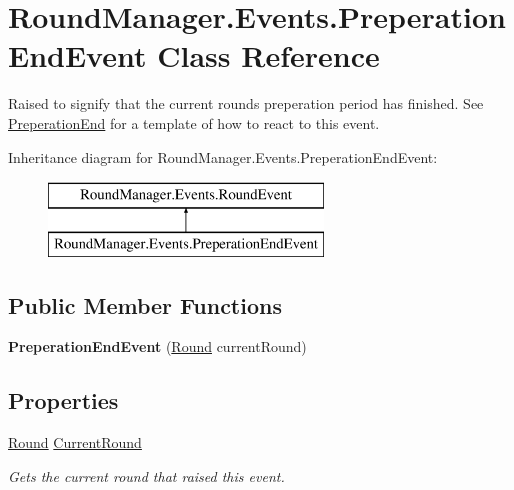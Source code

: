 \hypertarget{class_round_manager_1_1_events_1_1_preperation_end_event}{}\section{Round\+Manager.\+Events.\+Preperation\+End\+Event Class Reference}
\label{class_round_manager_1_1_events_1_1_preperation_end_event}


Raised to signify that the current rounds preperation period has finished. See \hyperlink{class_round_manager_1_1_preperation_end}{Preperation\+End} for a template of how to react to this event.  


Inheritance diagram for Round\+Manager.\+Events.\+Preperation\+End\+Event\+:\begin{figure}[H]
\begin{center}
\leavevmode
\includegraphics[height=2.000000cm]{class_round_manager_1_1_events_1_1_preperation_end_event}
\end{center}
\end{figure}
\subsection*{Public Member Functions}
\begin{DoxyCompactItemize}
\item 
\hypertarget{class_round_manager_1_1_events_1_1_preperation_end_event_a34df54db3fdae216f3e5bf65b3c54ace}{}{\bfseries Preperation\+End\+Event} (\hyperlink{class_round_manager_1_1_round}{Round} current\+Round)\label{class_round_manager_1_1_events_1_1_preperation_end_event_a34df54db3fdae216f3e5bf65b3c54ace}

\end{DoxyCompactItemize}
\subsection*{Properties}
\begin{DoxyCompactItemize}
\item 
\hyperlink{class_round_manager_1_1_round}{Round} \hyperlink{class_round_manager_1_1_events_1_1_preperation_end_event_a66c6c85f8cd0a6ead13051f2ae73e286}{Current\+Round}
\begin{DoxyCompactList}\small\item\em Gets the current round that raised this event. \end{DoxyCompactList}\end{DoxyCompactItemize}


